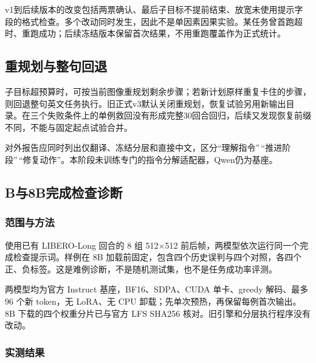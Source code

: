 v1到后续版本的改变包括两票确认、最后子目标不提前结束、放宽未使用提示字段的格式检查。多个改动同时发生，因此不是单因素因果实验。某任务曾首跑超时、重跑成功；后续冻结版本保留首次结果，不用重跑覆盖作为正式统计。

\subsection{重规划与整句回退}\label{s09-detail-3}

子目标超预算时，可按当前图像重规划剩余步骤；若新计划原样重复卡住的步骤，则回退整句英文任务执行。旧正式v3默认关闭重规划，恢复试验另用新输出目录。在三个失败条件上的单例救回没有形成完整30回合回归，后续又发现恢复前缀不同，不能与固定起点试验合并。

对外报告应同时列出仅翻译、冻结分层和直接中文，区分``理解指令''\,``推进阶段''\,``修复动作''。本阶段未训练专门的指令分解适配器，Qwen仍为基座。


\subsection{B与8B完成检查诊断}\label{s09-detail-4}

\subsubsection{范围与方法}\label{s09-detail-5}

使用已有 LIBERO-Long 回合的 8 组 512\(\times\)512 前后帧，两模型依次运行同一个完成检查提示词。样例在 8B 加载前固定，包含四个历史误判与四个对照，各四个正、负标签。这是难例诊断，不是随机测试集，也不是任务成功率评测。

两模型均为官方 Instruct 基座，BF16、SDPA、CUDA 单卡、greedy 解码、最多 96 个新 token，无 LoRA、无 CPU 卸载；先单次预热，再保留每例首次输出。8B 下载的四个权重分片已与官方 LFS SHA256 核对。旧引擎和分层执行程序没有改动。

\subsubsection{实测结果}\label{s09-detail-6}

